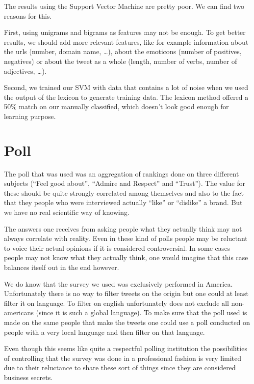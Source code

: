 \documentclass[a4paper,12pt]{report}
\begin{document}
The results using the Support Vector Machine are pretty poor. We can find two reasons for this.

First, using unigrams and bigrams as features may not be enough. To get better results, we should add more relevant features, like for example information about the urls (number, domain name, …), about the emoticons (number of positives, negatives) or about the tweet as a whole (length, number of verbs, number of adjectives, …).

Second, we trained our SVM with data that contains a lot of noise when we used the output of the lexicon to generate training data. The lexicon method offered a 50\% match on our manually classified, which doesn’t look good enough for learning purpose.

\section{Poll}

The poll that was used was an aggregation of rankings done on three different subjects (“Feel good about”, “Admire and Respect” and “Trust”). The value for these should be quite strongly correlated among themselves and also to the fact that they people who were interviewed actually “like” or “dislike” a brand. But we have no real scientific way of knowing.

The answers one receives from asking people what they actually think may not always correlate with reality. Even in these kind of polls people may be reluctant to voice their actual opinions if it is considered controversial. In some cases people may not know what they actually think, one would imagine that this case balances itself out in the end however.

We do know that the survey we used was exclusively performed in America. Unfortunately there is no way to filter tweets on the origin but one could at least filter it on language. To filter on english unfortunately does not exclude all non-americans (since it is such a global language). To make sure that the poll used is made on the same people that make the tweets one could use a poll conducted on people with a very local language and then filter on that language.

Even though this seems like quite a respectful polling institution the possibilities of controlling that the survey was done in a professional fashion is very limited due to their reluctance to share these sort of things since they are considered business secrets.
\end{document}
